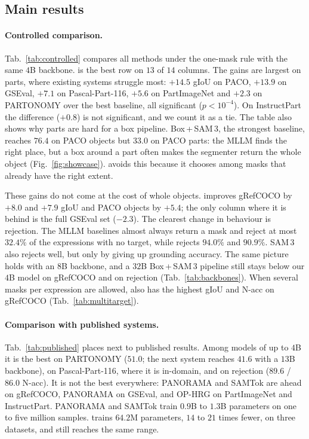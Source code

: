\subsection{Main results}
\label{sec:main_results}

\paragraph{Controlled comparison.}
Tab.~\ref{tab:controlled} compares all methods under the one-mask rule with the same $4$B backbone. \ours{} is the
best row on $13$ of $14$ columns. The gains are largest on parts, where existing systems struggle most: $+14.5$
gIoU on PACO, $+13.9$ on GSEval, $+7.1$ on Pascal-Part-116, $+5.6$ on PartImageNet and $+2.3$ on PARTONOMY over the
best baseline, all significant ($p<10^{-4}$). On InstructPart the difference ($+0.8$) is not significant, and we
count it as a tie. The table also shows why parts are hard for a box pipeline. Box\,+\,SAM\,3, the strongest
baseline, reaches $76.4$ on PACO objects but $33.0$ on PACO parts: the MLLM finds the right place, but a box around
a part often makes the segmenter return the whole object (Fig.~\ref{fig:showcase}). \ours{} avoids this because it
chooses among masks that already have the right extent.

These gains do not come at the cost of whole objects. \ours{} improves gRefCOCO by $+8.0$ and $+7.9$ gIoU and PACO
objects by $+5.4$; the only column where it is behind is the full GSEval set ($-2.3$). The clearest change in
behaviour is rejection. The MLLM baselines almost always return a mask and reject at most $32.4\%$ of the
expressions with no target, while \ours{} rejects $94.0\%$ and $90.9\%$. SAM\,3 also rejects well, but only by
giving up grounding accuracy. The same picture holds with an $8$B backbone, and a $32$B Box\,+\,SAM\,3 pipeline
still stays below our $4$B model on gRefCOCO and on rejection (Tab.~\ref{tab:backbones}). When several masks per
expression are allowed, \ours{} also has the highest gIoU and N-acc on gRefCOCO (Tab.~\ref{tab:multitarget}).

\paragraph{Comparison with published systems.}
Tab.~\ref{tab:published} places \ours{} next to published results. Among models of up to $4$B it is the best on
PARTONOMY ($51.0$; the next system reaches $41.6$ with a $13$B backbone), on Pascal-Part-116, where it is
in-domain, and on rejection ($89.6$ / $86.0$ N-acc). It is not the best everywhere: PANORAMA and SAMTok are ahead on
gRefCOCO, PANORAMA on GSEval, and OP-HRG on PartImageNet and InstructPart. PANORAMA and SAMTok train $0.9$B to
$1.3$B parameters on one to five million samples. \ours{} trains $64.2$M parameters, $14$ to $21$ times fewer, on
three datasets, and still reaches the same range.

